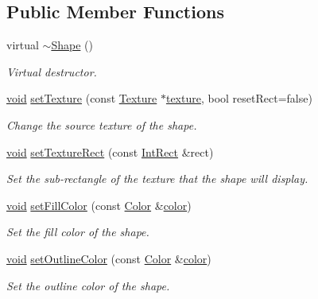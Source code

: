 \subsection*{Public Member Functions}
\begin{DoxyCompactItemize}
\item 
virtual \hyperlink{classsf_1_1_shape_a2262aceb9df52d4275c19633592f19bf}{$\sim$\-Shape} ()
\begin{DoxyCompactList}\small\item\em Virtual destructor. \end{DoxyCompactList}\item 
\hyperlink{glutf90_8h_ac778d6f63f1aaf8ebda0ce6ac821b56e}{void} \hyperlink{classsf_1_1_shape_af8fb22bab1956325be5d62282711e3b6}{set\-Texture} (const \hyperlink{classsf_1_1_texture}{Texture} $\ast$\hyperlink{gl3_8h_ab21590c4736d1459a5a0674a42b5a655}{texture}, bool reset\-Rect=false)
\begin{DoxyCompactList}\small\item\em Change the source texture of the shape. \end{DoxyCompactList}\item 
\hyperlink{glutf90_8h_ac778d6f63f1aaf8ebda0ce6ac821b56e}{void} \hyperlink{classsf_1_1_shape_a2029cc820d1740d14ac794b82525e157}{set\-Texture\-Rect} (const \hyperlink{namespacesf_aae67411782674934f78d55fa3af18403}{Int\-Rect} \&rect)
\begin{DoxyCompactList}\small\item\em Set the sub-\/rectangle of the texture that the shape will display. \end{DoxyCompactList}\item 
\hyperlink{glutf90_8h_ac778d6f63f1aaf8ebda0ce6ac821b56e}{void} \hyperlink{classsf_1_1_shape_a3506f9b5d916fec14d583d16f23c2485}{set\-Fill\-Color} (const \hyperlink{classsf_1_1_color}{Color} \&\hyperlink{gl3_8h_a3ea846f998d64f079b86052b6c4193a8}{color})
\begin{DoxyCompactList}\small\item\em Set the fill color of the shape. \end{DoxyCompactList}\item 
\hyperlink{glutf90_8h_ac778d6f63f1aaf8ebda0ce6ac821b56e}{void} \hyperlink{classsf_1_1_shape_a5978f41ee349ac3c52942996dcb184f7}{set\-Outline\-Color} (const \hyperlink{classsf_1_1_color}{Color} \&\hyperlink{gl3_8h_a3ea846f998d64f079b86052b6c4193a8}{color})
\begin{DoxyCompactList}\small\item\em Set the outline color of the shape. \end{DoxyCompactList}\item 

\end{DoxyCompactItemize}
